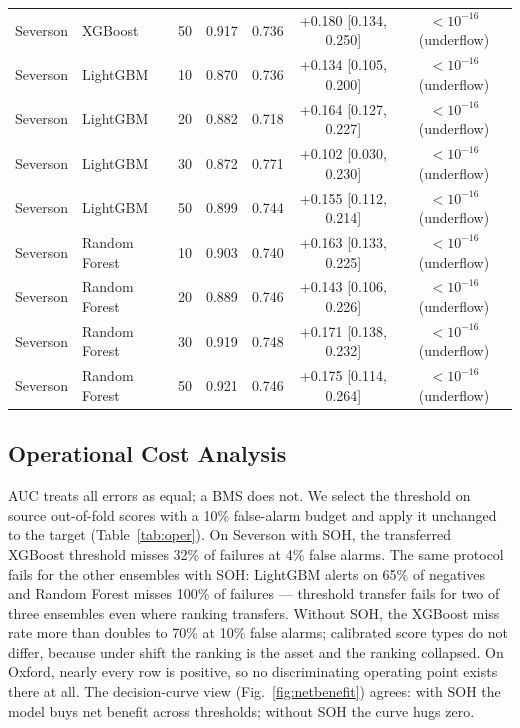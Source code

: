 \begin{table}[!t]
{\begin{tabular}{llccccc}
Severson & XGBoost & 50 & 0.917 & 0.736 & +0.180 [0.134, 0.250] & $<10^{-16}$ (underflow) \\
Severson & LightGBM & 10 & 0.870 & 0.736 & +0.134 [0.105, 0.200] & $<10^{-16}$ (underflow) \\
Severson & LightGBM & 20 & 0.882 & 0.718 & +0.164 [0.127, 0.227] & $<10^{-16}$ (underflow) \\
Severson & LightGBM & 30 & 0.872 & 0.771 & +0.102 [0.030, 0.230] & $<10^{-16}$ (underflow) \\
Severson & LightGBM & 50 & 0.899 & 0.744 & +0.155 [0.112, 0.214] & $<10^{-16}$ (underflow) \\
Severson & Random Forest & 10 & 0.903 & 0.740 & +0.163 [0.133, 0.225] & $<10^{-16}$ (underflow) \\
Severson & Random Forest & 20 & 0.889 & 0.746 & +0.143 [0.106, 0.226] & $<10^{-16}$ (underflow) \\
Severson & Random Forest & 30 & 0.919 & 0.748 & +0.171 [0.138, 0.232] & $<10^{-16}$ (underflow) \\
Severson & Random Forest & 50 & 0.921 & 0.746 & +0.175 [0.114, 0.264] & $<10^{-16}$ (underflow) \\
\bottomrule
\end{tabular}}
\end{table}

\subsection{Operational Cost Analysis}
AUC treats all errors as equal; a BMS does not. We select the threshold on source out-of-fold scores with a 10\% false-alarm budget and apply it unchanged to the target (Table~\ref{tab:oper}). On Severson with SOH, the transferred XGBoost threshold misses 32\% of failures at 4\% false alarms. The same protocol fails for the other ensembles with SOH: LightGBM alerts on 65\% of negatives and Random Forest misses 100\% of failures --- threshold transfer fails for two of three ensembles even where ranking transfers. Without SOH, the XGBoost miss rate more than doubles to 70\% at 10\% false alarms; calibrated score types do not differ, because under shift the ranking is the asset and the ranking collapsed. On Oxford, nearly every row is positive, so no discriminating operating point exists there at all. The decision-curve view (Fig.~\ref{fig:netbenefit}) agrees: with SOH the model buys net benefit across thresholds; without SOH the curve hugs zero.

